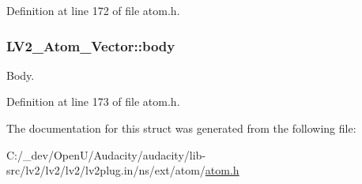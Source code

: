 Definition at line 172 of file atom.\+h.

\subsubsection[{\texorpdfstring{body}{body}}]{ L\+V2\+\_\+\+Atom\+\_\+\+Vector\+::body}\hypertarget{struct_l_v2___atom___vector_ab250440435a935db47a5a276c9c8cae1}{}\label{struct_l_v2___atom___vector_ab250440435a935db47a5a276c9c8cae1}
Body. 

Definition at line 173 of file atom.\+h.



The documentation for this struct was generated from the following file\+:\begin{DoxyCompactItemize}
\item 
C\+:/\+\_\+dev/\+Open\+U/\+Audacity/audacity/lib-\/src/lv2/lv2/lv2/lv2plug.\+in/ns/ext/atom/\hyperlink{atom_8h}{atom.\+h}\end{DoxyCompactItemize}
